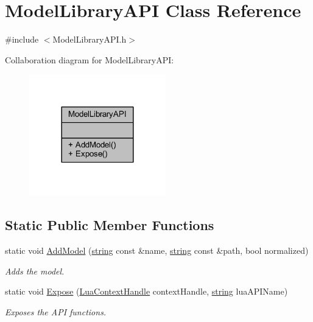 \hypertarget{class_model_library_a_p_i}{}\section{Model\+Library\+A\+PI Class Reference}
\label{class_model_library_a_p_i}


{\ttfamily \#include $<$Model\+Library\+A\+P\+I.\+h$>$}



Collaboration diagram for Model\+Library\+A\+PI\+:\nopagebreak
\begin{figure}[H]
\begin{center}
\leavevmode
\includegraphics[width=168pt]{class_model_library_a_p_i__coll__graph}
\end{center}
\end{figure}
\subsection*{Static Public Member Functions}
\begin{DoxyCompactItemize}
\item 
static void \hyperlink{class_model_library_a_p_i_aff106f8a92fea71b22c4464e0ffc893f}{Add\+Model} (\hyperlink{_types_8h_ad453f9f71ce1f9153fb748d6bb25e454}{string} const \&name, \hyperlink{_types_8h_ad453f9f71ce1f9153fb748d6bb25e454}{string} const \&path, bool normalized)
\begin{DoxyCompactList}\small\item\em Adds the model. \end{DoxyCompactList}\item 
static void \hyperlink{class_model_library_a_p_i_ad4be7e68d06c067d4b1ef67bc1e25956}{Expose} (\hyperlink{_lua_context_8h_a2ffcc2d3ed21165072a1d7b61259bf14}{Lua\+Context\+Handle} context\+Handle, \hyperlink{_types_8h_ad453f9f71ce1f9153fb748d6bb25e454}{string} lua\+A\+P\+I\+Name)
\begin{DoxyCompactList}\small\item\em Exposes the A\+PI functions. \end{DoxyCompactList}\end{DoxyCompactItemize}


